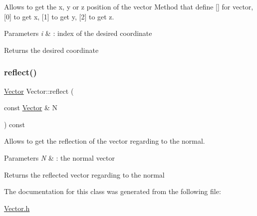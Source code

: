 Allows to get the x, y or z position of the vector Method that define \mbox{[}\mbox{]} for vector, \mbox{[}0\mbox{]} to get x, \mbox{[}1\mbox{]} to get y, \mbox{[}2\mbox{]} to get z. 


\begin{DoxyParams}{Parameters}
{\em i} & \+: index of the desired coordinate \\
\hline
\end{DoxyParams}
\begin{DoxyReturn}{Returns}
the desired coordinate 
\end{DoxyReturn}
\mbox{\label{classVector_a99c9023bbfa62e9de503a19d5adf2527}} 
\subsubsection{\texorpdfstring{reflect()}{reflect()}}
{\footnotesize\ttfamily \hyperlink{classVector}{Vector} Vector\+::reflect (\begin{DoxyParamCaption}\item[{const \hyperlink{classVector}{Vector} \&}]{N }\end{DoxyParamCaption}) const\hspace{0.3cm}{\ttfamily [inline]}}



Allows to get the reflection of the vector regarding to the normal. 


\begin{DoxyParams}{Parameters}
{\em N} & \+: the normal vector \\
\hline
\end{DoxyParams}
\begin{DoxyReturn}{Returns}
the reflected vector regarding to the normal 
\end{DoxyReturn}


The documentation for this class was generated from the following file\+:\begin{DoxyCompactItemize}
\item 
\hyperlink{Vector_8h}{Vector.\+h}\end{DoxyCompactItemize}
